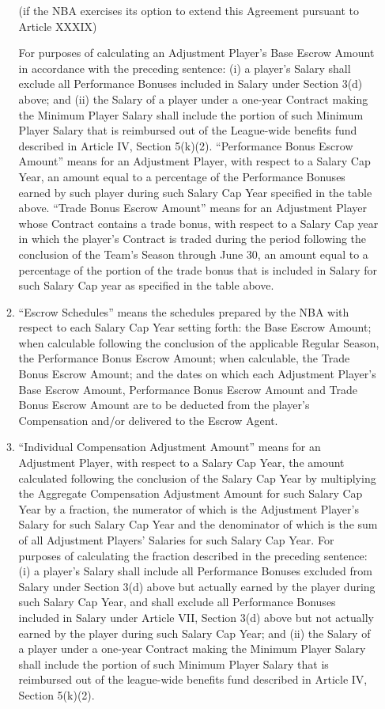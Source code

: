 \documentclass[
]{book}
\begin{document}
\begin{enumerate}
\begin{enumerate}
    (if the NBA exercises its option to extend this Agreement pursuant to Article XXXIX)

    For purposes of calculating an Adjustment Player's Base Escrow Amount in accordance with the preceding sentence: (i) a player's Salary shall exclude all Performance Bonuses included in Salary under Section 3(d) above; and (ii) the Salary of a player under a one-year Contract making the Minimum Player Salary shall include the portion of such Minimum Player Salary that is reimbursed out of the League-wide benefits fund described in Article IV, Section 5(k)(2). ``Performance Bonus Escrow Amount'' means for an Adjustment Player, with respect to a Salary Cap Year, an amount equal to a percentage of the Performance Bonuses earned by such player during such Salary Cap Year specified in the table above. ``Trade Bonus Escrow Amount'' means for an Adjustment Player whose Contract contains a trade bonus, with respect to a Salary Cap year in which the player's Contract is traded during the period following the conclusion of the Team's Season through June 30, an amount equal to a percentage of the portion of the trade bonus that is included in Salary for such Salary Cap year as specified in the table above.
  \item
    ``Escrow Schedules'' means the schedules prepared by the NBA with respect to each Salary Cap Year setting forth: the Base Escrow Amount; when calculable following the conclusion of the applicable Regular Season, the Performance Bonus Escrow Amount; when calculable, the Trade Bonus Escrow Amount; and the dates on which each Adjustment Player's Base Escrow Amount, Performance Bonus Escrow Amount and Trade Bonus Escrow Amount are to be deducted from the player's Compensation and/or delivered to the Escrow Agent.
  \item
    ``Individual Compensation Adjustment Amount'' means for an Adjustment Player, with respect to a Salary Cap Year, the amount calculated following the conclusion of the Salary Cap Year by multiplying the Aggregate Compensation Adjustment Amount for such Salary Cap Year by a fraction, the numerator of which is the Adjustment Player's Salary for such Salary Cap Year and the denominator of which is the sum of all Adjustment Players' Salaries for such Salary Cap Year. For purposes of calculating the fraction described in the preceding sentence: (i) a player's Salary shall include all Performance Bonuses excluded from Salary under Section 3(d) above but actually earned by the player during such Salary Cap Year, and shall exclude all Performance Bonuses included in Salary under Article VII, Section 3(d) above but not actually earned by the player during such Salary Cap Year; and (ii) the Salary of a player under a one-year Contract making the Minimum Player Salary shall include the portion of such Minimum Player Salary that is reimbursed out of the league-wide benefits fund described in Article IV, Section 5(k)(2).

\end{enumerate}
\end{enumerate}
\end{document}
